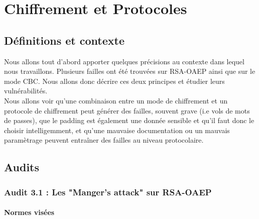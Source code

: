 \chapter{Chiffrement et Protocoles}

\section{Définitions et contexte}

Nous allons tout d'abord apporter quelques précisions au contexte dans lequel nous travaillons. Plusieurs failles ont été trouvées sur RSA-OAEP ainsi que sur le mode CBC. Nous allons donc décrire ces deux principes et étudier leurs vulnérabilités.\\

Nous allons voir qu'une combinaison entre un mode de chiffrement et un protocole de chiffrement peut générer des failles, souvent grave (i.e vols de mots de passes), que le padding est également une donnée sensible et qu'il faut donc le choisir intelligemment, et qu'une mauvaise documentation ou un mauvais paramètrage peuvent entraîner des failles au niveau protocolaire.

\section{Audits}
\subsection{Audit 3.1 : Les "Manger's attack" sur RSA-OAEP}
\subsubsection{Normes visées}

